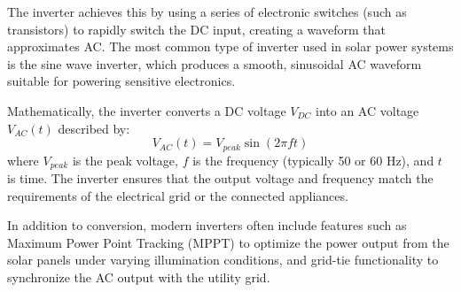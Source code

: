 The inverter achieves this by using a series of electronic switches (such as transistors) to rapidly switch the DC input, creating a waveform that approximates AC. The most common type of inverter used in solar power systems is the sine wave inverter, which produces a smooth, sinusoidal AC waveform suitable for powering sensitive electronics.

Mathematically, the inverter converts a DC voltage \( V_{DC} \) into an AC voltage \( V_{AC}(t) \) described by:
\[
V_{AC}(t) = V_{peak} \sin(2\pi ft)
\]
where \( V_{peak} \) is the peak voltage, \( f \) is the frequency (typically 50 or 60 Hz), and \( t \) is time. The inverter ensures that the output voltage and frequency match the requirements of the electrical grid or the connected appliances.

In addition to conversion, modern inverters often include features such as Maximum Power Point Tracking (MPPT) to optimize the power output from the solar panels under varying illumination conditions, and grid-tie functionality to synchronize the AC output with the utility grid.

